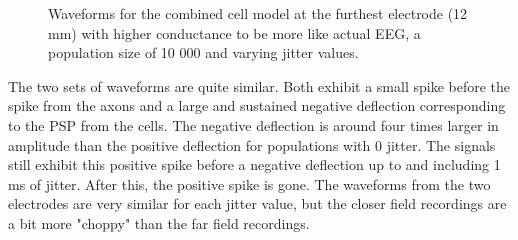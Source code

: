\documentclass[final, a4paper,masters,en,listoffigures,listoftables,norwegiandates]{NMBU}
\begin{document}
\begin{figure}[htbp]
    \centering
    \vspace*{-3cm}
    \caption{Waveforms for the combined cell model at the furthest electrode (12 mm) with higher conductance to be more like actual EEG, a population size of 10 000 and varying jitter values.}
    \label{fig:combinedwaveeg}
\end{figure}

The two sets of waveforms are quite similar. Both exhibit a small spike before the spike from the axons and a large and sustained negative deflection corresponding to the PSP from the cells. The negative deflection is around four times larger in amplitude than the positive deflection for populations with 0 jitter. The signals still exhibit this positive spike before a negative deflection up to and including 1 ms of jitter. After this, the positive spike is gone. The waveforms from the two electrodes are very similar for each jitter value, but the closer field recordings are a bit more "choppy" than the far field recordings. 
\end{document}

